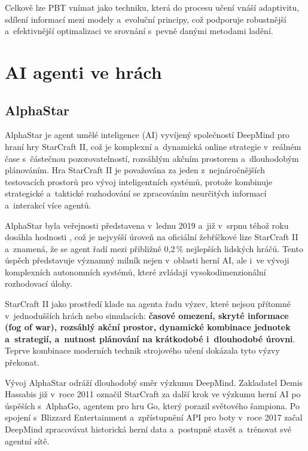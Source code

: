 Celkově lze PBT vnímat jako techniku, která do procesu učení vnáší adaptivitu, sdílení informací mezi modely a~evoluční principy, což podporuje robustnější a~efektivnější optimalizaci ve srovnání s~pevně danými metodami ladění.

\newpage

\section{AI agenti ve hrách}
\subsection{AlphaStar}

AlphaStar\cite{Vinyalsbr} je agent umělé inteligence (AI) vyvíjený společností DeepMind pro hraní hry StarCraft II\cite{WikiSC}, což je komplexní a~dynamická online strategie v~reálném čase s~částečnou pozorovatelností, rozsáhlým akčním prostorem a~dlouhodobým plánováním. Hra StarCraft II je považována za jeden z~nejnáročnějších testovacích prostorů pro vývoj inteligentních systémů, protože kombinuje strategické a~taktické rozhodování se zpracováním neurčitých informací a~interakcí více agentů.

AlphaStar byla veřejnosti představena v~lednu 2019 a~již v~srpnu téhož roku dosáhla hodnosti , což je nejvyšší úroveň na oficiální žebříčkové lize StarCraft II a~znamená, že se agent řadí mezi přibližně 0{,}2\,\% nejlepších lidských hráčů. Tento úspěch představuje významný milník nejen v~oblasti herní AI, ale i~ve vývoji komplexních autonomních systémů, které zvládají vysokodimenzionální rozhodovací úlohy.

StarCraft II jako prostředí klade na agenta řadu výzev, které nejsou přítomné v~jednodušších hrách nebo simulacích: \textbf{časové omezení, skryté informace (fog of war), rozsáhlý akční prostor, dynamické kombinace jednotek a~strategií, a~nutnost plánování na krátkodobé i~dlouhodobé úrovni}. Teprve kombinace moderních technik strojového učení dokázala tyto výzvy překonat.

Vývoj AlphaStar odráží dlouhodobý směr výzkumu DeepMind. Zakladatel Demis Hassabis již v~roce 2011 označil StarCraft za další krok ve výzkumu herní AI po úspěších s~AlphaGo, agentem pro hru Go, který porazil světového šampiona. Po spojení s~Blizzard Entertainment a~zpřístupnění API pro boty v~roce 2017 začal DeepMind zpracovávat historická herní data a~postupně stavět a~trénovat své agentní sítě.

